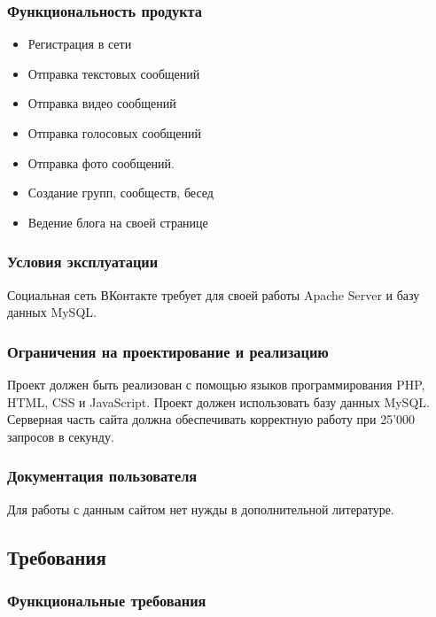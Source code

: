 \subsubsection{Функциональность продукта}
\begin{itemize}
  \item Регистрация в сети
  \item Отправка текстовых сообщений
  \item Отправка видео сообщений
  \item Отправка голосовых сообщений
  \item Отправка фото сообщений.
  \item Создание групп, сообществ, бесед
  \item Ведение блога на своей странице
\end{itemize}

\subsubsection{Условия эксплуатации}
Социальная сеть ВКонтакте требует
для своей работы Apache Server и базу данных MySQL.

\subsubsection{Ограничения на проектирование и реализацию}
Проект должен быть реализован с помощью языков программирования PHP, HTML, CSS и JavaScript.
Проект должен использовать базу данных MySQL.
Серверная часть сайта должна обеспечивать
корректную работу при 25'000 запросов в секунду.

\subsubsection{Документация пользователя}
Для работы с данным сайтом нет нужды в дополнительной литературе.

\subsection{Требования}
\subsubsection{Функциональные требования}
